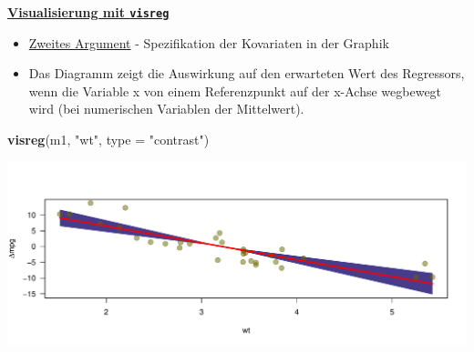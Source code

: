 \documentclass[ignorenonframetext,]{beamer}
\newenvironment{Shaded}{\begin{snugshade}}{\end{snugshade}}
\newcommand{\KeywordTok}[1]{\textcolor[rgb]{0.13,0.29,0.53}{\textbf{#1}}}
\newcommand{\DataTypeTok}[1]{\textcolor[rgb]{0.13,0.29,0.53}{#1}}
\newcommand{\StringTok}[1]{\textcolor[rgb]{0.31,0.60,0.02}{#1}}
\newcommand{\NormalTok}[1]{#1}
\providecommand{\tightlist}{%
  \setlength{\itemsep}{0pt}\setlength{\parskip}{0pt}}
\begin{document}
\begin{frame}[fragile]{\href{http://myweb.uiowa.edu/pbreheny/publications/visreg.pdf}{\textbf{Visualisierung
mit \texttt{visreg}}}}

\begin{itemize}
\tightlist
\item
  \href{http://pbreheny.github.io/visreg}{Zweites Argument} -
  Spezifikation der Kovariaten in der Graphik
\item
  Das Diagramm zeigt die Auswirkung auf den erwarteten Wert des
  Regressors, wenn die Variable x von einem Referenzpunkt auf der
  x-Achse wegbewegt wird (bei numerischen Variablen der Mittelwert).
\end{itemize}

\begin{Shaded}
\begin{Highlighting}[]
\KeywordTok{visreg}\NormalTok{(m1, }\StringTok{"wt"}\NormalTok{, }\DataTypeTok{type =} \StringTok{"contrast"}\NormalTok{)}
\end{Highlighting}
\end{Shaded}

\includegraphics{B3_linreg_files/figure-beamer/unnamed-chunk-32-1.pdf}

\end{frame}
\end{document}
